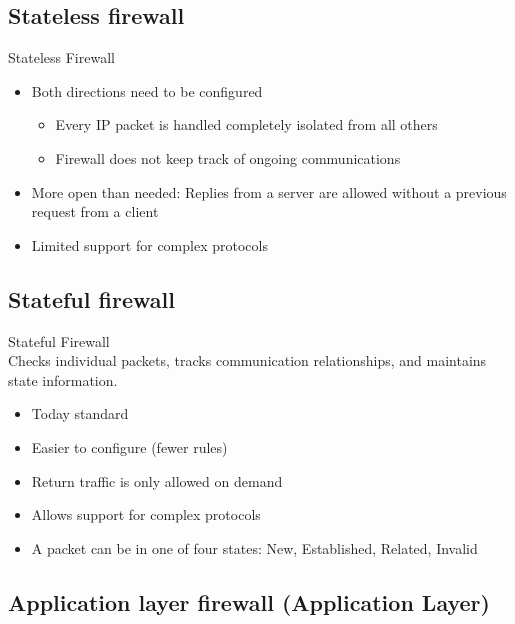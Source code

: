 \subsection{Stateless firewall}

\begin{concept}{Stateless Firewall}\\
    \begin{itemize}
        \item Both directions need to be configured
        \begin{itemize}
            \item Every IP packet is handled completely isolated from all others
            \item Firewall does not keep track of ongoing communications
        \end{itemize}
        \item More open than needed: Replies from a server are allowed without a previous request from a client
        \item Limited support for complex protocols
    \end{itemize}
\end{concept}

\subsection{Stateful firewall}

\begin{definition}{Stateful Firewall}\\
    Checks individual packets, tracks communication relationships, and maintains state information.
    \begin{itemize}
        \item Today standard
        \item Easier to configure (fewer rules)
        \item Return traffic is only allowed on demand
        \item Allows support for complex protocols
        \item A packet can be in one of four states: New, Established, Related, Invalid
    \end{itemize}
\end{definition}


\subsection{Application layer firewall (Application Layer)}

